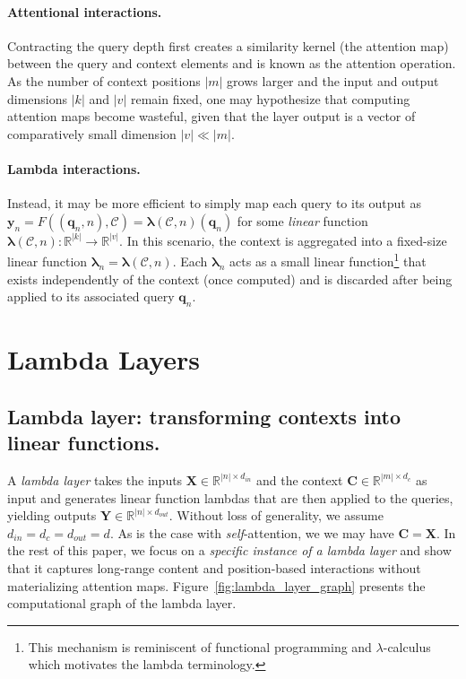 \documentclass{article} \usepackage{iclr2021_conference,times}
\begin{document}
\vspace{-0.1cm}
\paragraph{Attentional interactions.}
Contracting the query depth first creates a similarity kernel (the attention map) between the query and context elements and is known as the attention operation.
As the number of context positions $|m|$ grows larger and the input and output dimensions $|k|$ and $|v|$ remain fixed, one may hypothesize that computing attention maps become wasteful, given that the layer output is a vector of comparatively small dimension $|v| \ll |m|$.

\vspace{-0.1cm}
\paragraph{Lambda interactions.}
Instead, it may be more efficient to simply map each query to its output as $\boldsymbol{y}_n = F((\boldsymbol{q}_n, n), \mathcal{C}) = \boldsymbol{\lambda}(\mathcal{C}, n)(\boldsymbol{q}_n)$ for some \emph{linear} function $\boldsymbol{\lambda}(\mathcal{C}, n): \mathbb{R}^{|k|} \rightarrow \mathbb{R}^{|v|}$.
In this scenario, the context is aggregated into a fixed-size linear function $\boldsymbol{\lambda}_n = \boldsymbol{\lambda}(\mathcal{C}, n)$.
Each $\boldsymbol{\lambda}_n$ acts as a small linear function\footnote{
This mechanism is reminiscent of functional programming and $\lambda$-calculus which motivates the lambda terminology.} that exists independently of the context (once computed) and is discarded after being applied to its associated query $\boldsymbol{q}_n$. \section{Lambda Layers\label{sec:lambda_layer}}

\subsection{Lambda layer: transforming contexts into linear functions.}
A \emph{lambda layer} takes the inputs $\boldsymbol{X} \in \mathbb{R}^{|n|\times d_{in}}$ and the context $\boldsymbol{C} \in \mathbb{R}^{|m|\times d_c}$ as input and generates linear function lambdas that are then applied to the queries, yielding outputs $\boldsymbol{Y} \in \mathbb{R}^{|n|\times d_{out}}$.
Without loss of generality, we assume $d_{in}=d_c=d_{out}=d$.
As is the case with \emph{self}-attention, we we may have $\boldsymbol{C} = \boldsymbol{X}$.
In the rest of this paper, we focus on a \emph{specific instance of a lambda layer} and show that it captures long-range content and position-based interactions without materializing attention maps.
Figure~\ref{fig:lambda_layer_graph} presents the computational graph of the lambda layer.
\end{document}
